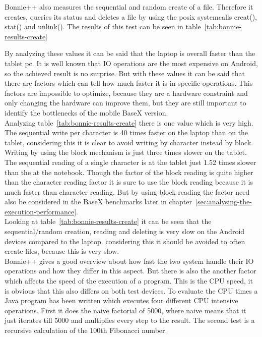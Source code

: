 
Bonnie++ also measures the sequential and random create of a file.
Therefore it creates, queries its status and deletes a file by using the posix systemcalls creat(), stat() and unlink().
The results of this test can be seen in table~\ref{tab:bonnie-results-create}

By analyzing these values it can be said that the laptop is overall faster than the tablet pc.
It is well known that IO operations are the most expensive on Android, so the achieved result is no surprise. 
But with these values it can be said that there are factors which can tell how much faster it is in specific operations.
This factors are impossible to optimize, because they are a hardware constraint and only changing the hardware can improve them, but they are still important to identify the bottlenecks of the mobile BaseX version.\\
Analyzing table~\ref{tab:bonnie-results-create} there is one value which is very high.
The sequential write per character is 40 times faster on the laptop than on the tablet, considering this it is clear to avoid writing by character instead by block.
Writing by using the block mechanism is just three times slower on the tablet.
The sequential reading of a single character is at the tablet just 1.52 times slower than the at the notebook.
Though the factor of the block reading is quite higher than the character reading factor it is sure to use the block reading because it is much faster than character reading.
But by using block reading the factor need also be considered in the BaseX benchmarks later in chapter~\ref{sec:analysing-the-execution-performance}.
\\
Looking at table~\ref{tab:bonnie-results-create} it can be seen that the sequential/random creation, reading and deleting is very slow on the Android devices compared to the laptop.
considering this it should be avoided to often create files, because this is very slow.\\
Bonnie++ gives a good overview about how fast the two system handle their IO operations and how they differ in this aspect.
But there is also the another factor which affects the speed of the execution of a program.
This is the CPU speed, it is obvious that this also differs on both test devices.
To evaluate the CPU times a Java program has been written which executes four different CPU intensive operations.
First it does the naive factorial of 5000, where naive means that it just iterates till 5000 and multiplies every step to the result.
The second test is a recursive calculation of the 100th Fibonacci number.

